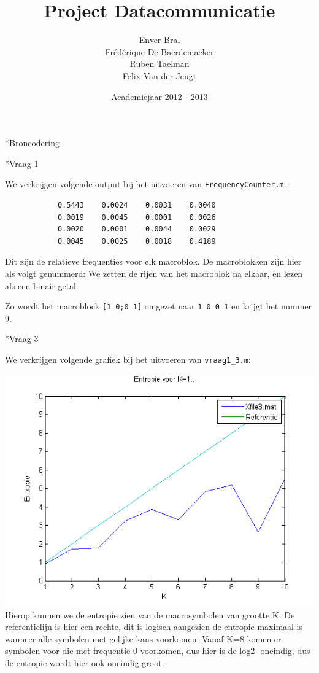 \documentclass[]{article}
\begin{document}
\title{Project Datacommunicatie}
\author{Enver Bral \\ Fr\'ed\'erique De Baerdemaeker \\ Ruben Taelman \\ Felix Van der Jeugt}
\date{Academiejaar 2012 - 2013}
\maketitle

\begin{section}*{Broncodering}

    \begin{subsection}*{Vraag 1}

        We verkrijgen volgende output bij het uitvoeren van
        \texttt{FrequencyCounter.m}:

        \begin{lstlisting}
            0.5443    0.0024    0.0031    0.0040
            0.0019    0.0045    0.0001    0.0026
            0.0020    0.0001    0.0044    0.0029
            0.0045    0.0025    0.0018    0.4189
        \end{lstlisting}

        Dit zijn de relatieve frequenties voor elk macroblok. De
        macroblokken zijn hier als volgt genummerd: We zetten de rijen
        van het macroblok na elkaar, en lezen als een binair getal.

        Zo wordt het macroblock \texttt{[1 0;0 1]} omgezet naar
        \texttt{1 0 0 1} en krijgt het nummer $9$.

    \end{subsection}
    
        \begin{subsection}*{Vraag 3}

        We verkrijgen volgende grafiek bij het uitvoeren van
        \texttt{vraag1\_3.m}:

        \includegraphics{vraag1_3.png}
		Hierop kunnen we de entropie zien van de macrosymbolen van grootte K. De referentielijn is hier een rechte, dit is logisch aangezien de entropie maximaal is wanneer alle symbolen met gelijke kans voorkomen.
		Vanaf K=8 komen er symbolen voor die met frequentie 0 voorkomen, dus hier is de log2 -oneindig, dus de entropie wordt hier ook oneindig groot.


\end{subsection}
\end{section}
\end{document}
